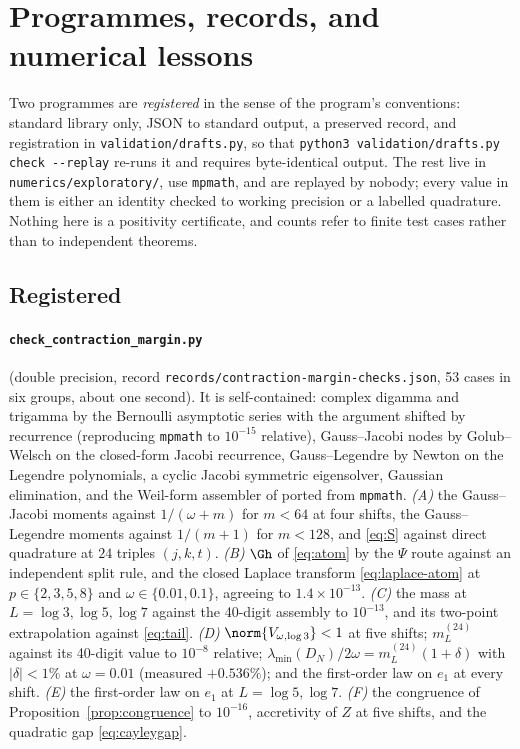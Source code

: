 \section{Programmes, records, and numerical lessons}\label{app:numerics}

Two programmes are \emph{registered} in the sense of the program's conventions:
standard library only, JSON to standard output, a preserved record, and
registration in \texttt{validation/drafts.py}, so that
\texttt{python3 validation/drafts.py check -{}-replay} re-runs it and requires
byte-identical output. The rest live in \texttt{numerics/exploratory/}, use
\texttt{mpmath}, and are replayed by nobody; every value in them is either an
identity checked to working precision or a labelled quadrature. Nothing here is
a positivity certificate, and counts refer to finite test cases rather than to
independent theorems.

\subsection*{Registered}

\paragraph{\texttt{check\_contraction\_margin.py}} (double precision, record
\texttt{records/\allowbreak contraction-\allowbreak margin-\allowbreak checks.json}, 53 cases in six
groups, about one second). It is self-contained: complex digamma and trigamma
by the Bernoulli asymptotic series with the argument shifted by recurrence
(reproducing \texttt{mpmath} to $10^{-15}$ relative), Gauss--Jacobi nodes by
Golub--Welsch on the closed-form Jacobi recurrence, Gauss--Legendre by Newton on
the Legendre polynomials, a cyclic Jacobi symmetric eigensolver, Gaussian
elimination, and the Weil-form assembler of \cite{FrameBound} ported from
\texttt{mpmath}. \emph{(A)} the Gauss--Jacobi moments against $1/(\omega+m)$ for
$m<64$ at four shifts, the Gauss--Legendre moments against $1/(m+1)$ for
$m<128$, and \eqref{eq:S} against direct quadrature at $24$ triples $(j,k,t)$.
\emph{(B)} $\Gh$ of \eqref{eq:atom} by the $\Psi$ route against an independent
split rule, and the closed Laplace transform \eqref{eq:laplace-atom} at
$p\in\{2,3,5,8\}$ and $\omega\in\{0.01,0.1\}$, agreeing to $1.4\times10^{-13}$.
\emph{(C)} the mass at $L=\log3,\log5,\log7$ against the 40-digit assembly to
$10^{-13}$, and its two-point extrapolation against \eqref{eq:tail}.
\emph{(D)} $\norm{V_{\omega,\log3}}<1$ at five shifts; $m_L^{(24)}$ against its
40-digit value to $10^{-8}$ relative; $\lambda_{\min}(D_N)/2\omega=m_L^{(24)}(1+\delta)$
with $|\delta|<1\%$ at $\omega=0.01$ (measured $+0.536\%$); and the first-order
law on $e_1$ at every shift. \emph{(E)} the first-order law on $e_1$ at
$L=\log5,\log7$. \emph{(F)} the congruence of
Proposition~\ref{prop:congruence} to $10^{-16}$, accretivity of $Z$ at five
shifts, and the quadratic gap \eqref{eq:cayleygap}.

